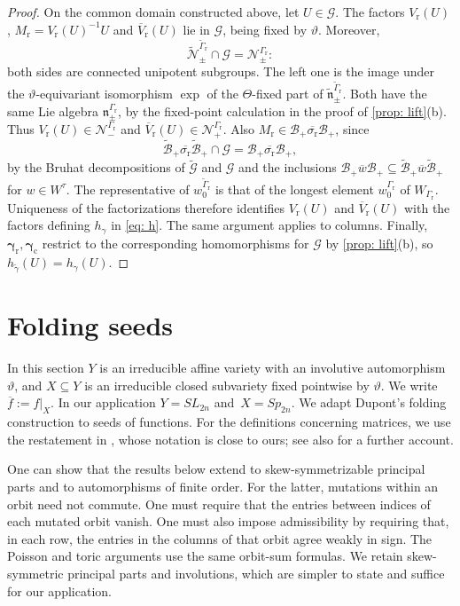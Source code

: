 \documentclass[a4paper]{amsart}
\numberwithin{equation}{section}
\theoremstyle{definition}
\theoremstyle{remark}
\newcommand{\mfn}{\mathfrak{n}}
\newcommand{\mcG}{\mathcal{G}}
\newcommand{\mcN}{\mathcal{N}}
\newcommand{\mcB}{\mathcal{B}}
\newcommand{\tG}{\widetilde{\mcG}}
\newcommand{\tg}{\widetilde{\gamma}}
\newcommand{\vt}{\vartheta}
\newcommand{\Vt}{\Theta}
\newcommand{\rr}{\mathrm{r}}
\newcommand{\cc}{\mathrm{c}}
\newcommand{\Sp}{Sp_{2n}}
\newcommand{\SL}{SL_{2n}}
\begin{document}
\begin{proof}
  On the common domain constructed above, let $U\in\mcG$.
  The factors $V_{\rr}(U)$, $M_{\rr}=V_{\rr}(U)^{-1}U$ and $\overline{V}_{\rr}(U)$ lie in $\mcG$, being fixed by $\vt$.
  Moreover,
  \[
    \widetilde{\mcN}_\pm^{\widetilde{\Gamma}_{\rr}}\cap\mcG=\mcN_\pm^{\Gamma_{\rr}}:
  \]
  both sides are connected unipotent subgroups.
  The left one is the image under the $\vt$-equivariant isomorphism $\exp$ of the $\Vt$-fixed part of $\widetilde{\mfn}_\pm^{\widetilde{\Gamma}_{\rr}}$.
  Both have the same Lie algebra $\mfn_\pm^{\Gamma_{\rr}}$, by the fixed-point calculation in the proof of \cref{prop: lift}(b).
  Thus $V_{\rr}(U)\in\mcN_-^{\Gamma_{\rr}}$ and $\overline{V}_{\rr}(U)\in\mcN_+^{\Gamma_{\rr}}$.
  Also $M_{\rr}\in\mcB_+\overline{\sigma_{\rr}}\mcB_+$, since
  \[
    \widetilde{\mcB}_+\overline{\sigma_{\rr}}\widetilde{\mcB}_+\cap\mcG
    =\mcB_+\overline{\sigma_{\rr}}\mcB_+,
  \]
  by the Bruhat decompositions of $\tG$ and $\mcG$ and the inclusions $\mcB_+\overline{w}\mcB_+\subseteq\widetilde{\mcB}_+\overline{w}\widetilde{\mcB}_+$ for $w\in W^\tau$.
  The representative of $w_0^{\widetilde{\Gamma}_{\rr}}$ is that of the longest element $w_0^{\Gamma_{\rr}}$ of $W_{\Gamma_{\rr}}$.
  Uniqueness of the factorizations therefore identifies $V_{\rr}(U)$ and $\overline{V}_{\rr}(U)$ with the factors defining $h_\gamma$ in \eqref{eq: h}.
  The same argument applies to columns.
  Finally, $\boldsymbol\gamma_{\rr},\boldsymbol\gamma_{\cc}$ restrict to the corresponding homomorphisms for $\mcG$ by \cref{prop: lift}(b), so~$h_{\tg}(U)=h_\gamma(U)$.
\end{proof}

\section{Folding seeds}
\label{sec: folding}
In this section $Y$ is an irreducible affine variety with an involutive automorphism $\vt$, and $X\subseteq Y$ is an irreducible closed subvariety fixed pointwise by $\vt$.
We write $\overline{f}:=f|_X$.
In our application $Y=\SL$ and~$X=\Sp$.
We adapt Dupont's folding construction \cite{Dup08} to seeds of functions.
For the definitions concerning matrices, we use the restatement in \cite[Section~5.1]{NS14}, whose notation is close to ours; see also \cite[Section~2.3]{Vie18} for a further account.

\begin{remark}
  \label{rmk: folding generality}
  One can show that the results below extend to skew-symmetrizable principal parts and to automorphisms of finite order.
  For the latter, mutations within an orbit need not commute.
  One must require that the entries between indices of each mutated orbit vanish.
  One must also impose admissibility by requiring that, in each row, the entries in the columns of that orbit agree weakly in sign.
  The Poisson and toric arguments use the same orbit-sum formulas.
  We retain skew-symmetric principal parts and involutions, which are simpler to state and suffice for our application.
\end{remark}
\end{document}
